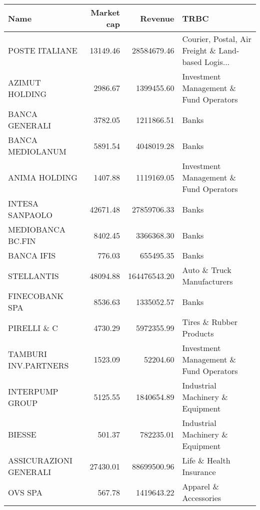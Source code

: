 \begin{tabular}{lrrl}
\toprule
                  Name &  Market cap &      Revenue &                                               TRBC \\
\midrule
        POSTE ITALIANE &    13149.46 &  28584679.46 & Courier, Postal, Air Freight \& Land-based Logis... \\
        AZIMUT HOLDING &     2986.67 &   1399455.60 &             Investment Management \& Fund Operators \\
        BANCA GENERALI &     3782.05 &   1211866.51 &                                              Banks \\
      BANCA MEDIOLANUM &     5891.54 &   4048019.28 &                                              Banks \\
         ANIMA HOLDING &     1407.88 &   1119169.05 &             Investment Management \& Fund Operators \\
       INTESA SANPAOLO &    42671.48 &  27859706.33 &                                              Banks \\
     MEDIOBANCA BC.FIN &     8402.45 &   3366368.30 &                                              Banks \\
            BANCA IFIS &      776.03 &    655495.35 &                                              Banks \\
            STELLANTIS &    48094.88 & 164476543.20 &                         Auto \& Truck Manufacturers \\
        FINECOBANK SPA &     8536.63 &   1335052.57 &                                              Banks \\
           PIRELLI \& C &     4730.29 &   5972355.99 &                            Tires \& Rubber Products \\
  TAMBURI INV.PARTNERS &     1523.09 &     52204.60 &             Investment Management \& Fund Operators \\
       INTERPUMP GROUP &     5125.55 &   1840654.89 &                   Industrial Machinery \& Equipment \\
                BIESSE &      501.37 &    782235.01 &                   Industrial Machinery \& Equipment \\
ASSICURAZIONI GENERALI &    27430.01 &  88699500.96 &                            Life \& Health Insurance \\
               OVS SPA &      567.78 &   1419643.22 &                              Apparel \& Accessories \\

\end{tabular}
